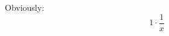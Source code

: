 \documentclass[a4paper,14pt]{article}
\begin{document}
Obviously:
$$1\cdot\frac{1}{x}$$
\end{document}
